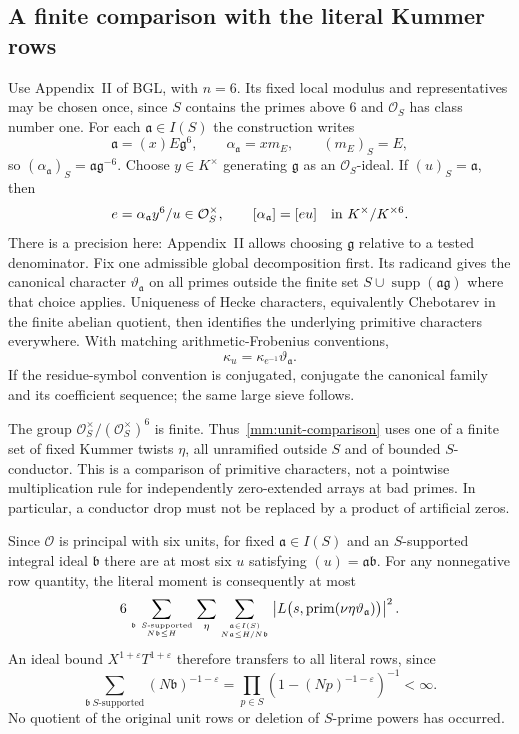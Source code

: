 \documentclass[11pt,oneside,openany]{book}
\theoremstyle{definition}\newtheorem{definition}[theorem]{Definition}
\theoremstyle{remark}\newtheorem{remark}[theorem]{Remark}
\begin{document}
\subsection{A finite comparison with the literal Kummer rows}
Use Appendix~II of BGL, with $n=6$. Its fixed local modulus and
representatives may be chosen once, since $S$ contains the primes above
$6$ and $\mathcal O_S$ has class number one. For each
$\mathfrak a\in I(S)$ the construction writes
\[
 \mathfrak a=(x)E\mathfrak g^6,\qquad
 \alpha_{\mathfrak a}=xm_E,\qquad
 (m_E)_S=E,
\]
so $(\alpha_{\mathfrak a})_S=\mathfrak a\mathfrak g^{-6}$.
Choose $y\in K^\times$ generating $\mathfrak g$ as an
$\mathcal O_S$-ideal. If $(u)_S=\mathfrak a$, then
\[
 e=\alpha_{\mathfrak a}y^6/u\in\mathcal O_S^\times,\qquad
 [\alpha_{\mathfrak a}]=[eu]\quad\hbox{in }K^\times/K^{\times6}.
\]
There is a precision here: Appendix~II allows choosing $\mathfrak g$
relative to a tested denominator. Fix one admissible global decomposition
first. Its radicand gives the canonical character
$\vartheta_{\mathfrak a}$ on all primes outside the finite set
$S\cup\operatorname{supp}(\mathfrak a\mathfrak g)$ where that
choice applies. Uniqueness of Hecke characters, equivalently Chebotarev
in the finite abelian quotient, then identifies the underlying primitive
characters everywhere. With matching arithmetic-Frobenius conventions,
\begin{equation}\label{mm:unit-comparison}
 \kappa_u=\kappa_{e^{-1}}\vartheta_{\mathfrak a}.
\end{equation}
If the residue-symbol convention is conjugated, conjugate the canonical
family and its coefficient sequence; the same large sieve follows.

The group $\mathcal O_S^\times/(\mathcal O_S^\times)^6$ is finite.
Thus~\eqref{mm:unit-comparison} uses one of a finite set of fixed
Kummer twists $\eta$, all unramified outside $S$ and of bounded
$S$-conductor. This is a comparison of primitive characters, not a
pointwise multiplication rule for independently zero-extended arrays at
bad primes. In particular, a conductor drop must not be replaced by a
product of artificial zeros.

Since $\mathcal O$ is principal with six units, for fixed
$\mathfrak a\in I(S)$ and an $S$-supported integral ideal
$\mathfrak b$ there are at most six $u$ satisfying
$(u)=\mathfrak a\mathfrak b$. For any nonnegative row quantity, the
literal moment is consequently at most
\begin{equation}\label{mm:literal-sum}
 6\sum_{\mathfrak b\ S\text{-supported}\atop N\mathfrak b\le H}
   \sum_{\eta}\sum_{\mathfrak a\in I(S)\atop N\mathfrak a\le H/N\mathfrak b}
 \left|L\bigl(s,\operatorname{prim}(\nu\eta
                       \vartheta_{\mathfrak a})\bigr)\right|^2.
\end{equation}
An ideal bound $X^{1+\varepsilon}T^{1+\varepsilon}$ therefore transfers
to all literal rows, since
\[
 \sum_{\mathfrak b\ S\text{-supported}}(N\mathfrak b)^{-1-\varepsilon}
 =\prod_{p\in S}(1-(Np)^{-1-\varepsilon})^{-1}<\infty.
\]
No quotient of the original unit rows or deletion of $S$-prime powers
has occurred.
\end{document}
